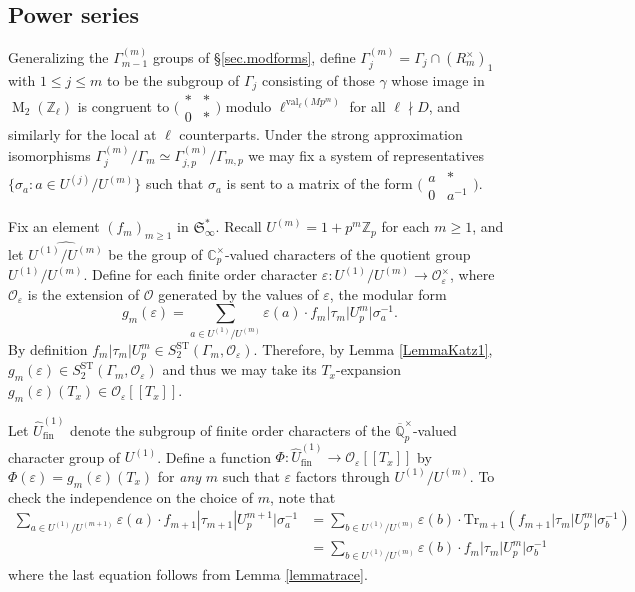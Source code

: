 \documentclass[a4paper,11pt]{amsart}
\numberwithin{equation}{section}
\theoremstyle{plain}
\theoremstyle{definition}
\theoremstyle{remark}
\newtheorem{remark}[theorem]{Remark}
\newcommand{\Q}{\mathbb{Q}}
\newcommand{\Z}{\mathbb{Z}}
\newcommand{\C}{\mathbb{C}}
\DeclareMathOperator{\M}{M}
\newcommand{\val}{\mathrm{val}}
\newcommand{\ST}{\mathrm{ST}}
\newcommand{\smallmat}[4]{\bigl(\begin{smallmatrix}#1&#2\\#3&#4\end{smallmatrix}\bigr)}
\begin{document}

\subsection{Power series}\label{sec:measures}
{Generalizing the $\Gamma^{(m)}_{m-1}$ groups of \S\ref{sec.modforms}, define $\Gamma^{(m)}_j=\Gamma_j\cap(R^\times_m)_1$ with $1\le j\le m$ to be the subgroup of $\Gamma_j$ consisting of those $\gamma$ whose image in $\M_2(\Z_\ell)$ is congruent to $\smallmat{*}{*}{0}{*}$ modulo $\ell^{\val_\ell(Mp^m)}$ for all $\ell\nmid D$, and similarly for the local at $\ell$ counterparts. Under the strong approximation isomorphisms $\Gamma^{(m)}_j/\Gamma_m\simeq\Gamma^{(m)}_{j,p}/\Gamma_{m,p}$ we may fix a system of representatives $\{\sigma_a:a\in U^{(j)}/U^{(m)}\}$ such that $\sigma_a$ is sent to a matrix of the form $\smallmat{a}{*}{0}{a^{-1}}$.}

Fix an element 
$(f_m)_{m\geq 1}$ in $\mathfrak{S}_\infty^*$. 
Recall $U^{(m)}=1+p^m\Z_p$ for each $m\geq 1$, and let $\widehat{U^{(1)}/U^{(m)}}$ be the group of $\C_p^\times$-valued 
characters of the quotient group $U^{(1)}/U^{(m)}$. Define for each finite order character $\varepsilon\colon U^{(1)}/U^{(m)}\rightarrow \mathcal{O}^\times_\varepsilon$, where $\mathcal{O}_\varepsilon$ is the 
extension of $\mathcal{O}$ generated by the values of $\varepsilon$, the modular form
\begin{equation}\label{gm}
g_m(\varepsilon)=\sum_{a\in U^{(1)}/U^{(m)}}\varepsilon(a)\cdot f_m|\tau_m|U_p^m|\sigma_a^{-1}.\end{equation}
By definition $f_m|\tau_m|U_p^m\in S_2^\ST(\Gamma_m, \mathcal{O}_\varepsilon)$. 
Therefore, by Lemma \ref{LemmaKatz1}, $g_m(\varepsilon)\in S_2^\ST(\Gamma_m, \mathcal{O}_\varepsilon)$ 
and thus we may take its $T_x$-expansion 
$g_m(\varepsilon)(T_x)\in \mathcal{O}_\varepsilon[[T_x]].$ 

Let $\widehat{U}_{\mathrm{fin}}^{(1)}$ denote the subgroup of finite order characters 
of the $\overline{\Q}_p^\times$-valued character group of $U^{(1)}$. 
Define a function $\Phi\colon \widehat{U}_{\mathrm{fin}}^{(1)}\rightarrow \mathcal{O}_\varepsilon[[T_x]]$ by  
$\Phi(\varepsilon)=g_m(\varepsilon)(T_x)$
for \emph{any} $m$ such that $\varepsilon$ factors through $U^{(1)}/U^{(m)}$. To check the independence 
on the choice of $m$, note that
\[\begin{split}
  \sum_{a\in U^{(1)}/U^{(m+1)}}\varepsilon(a)\cdot f_{m+1}|\tau_{m+1}|U_p^{m+1}|\sigma_a^{-1}&=
  \sum_{b\in U^{(1)}/U^{(m)}}\varepsilon(b)\cdot\mathrm{Tr}_{m+1}(f_{m+1}|\tau_m|U_p^m|\sigma_b^{-1})\\
  &=\sum_{b\in U^{(1)}/U^{(m)}}\varepsilon(b)\cdot f_m|\tau_m|U_p^m|\sigma_b^{-1}
\end{split}\]where the last equation follows from Lemma \ref{lemmatrace}.
\end{document}
